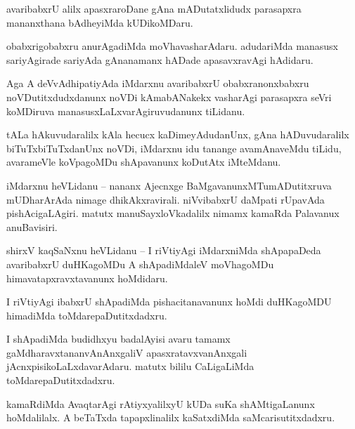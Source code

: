 \documentclass{article}
\begin{document}
\begin{mn}%
avaribabxrU alilx apasxraroDane gAna mADutatxlidudx parasapxra mananxthana bAdheyiMda kUDikoMDaru.
\end{mn}

\begin{mn}%
obabxrigobabxru anurAgadiMda moVhavasharAdaru. adudariMda manasusx sariyAgirade sariyAda gAnanamanx 
hADade apasavxravAgi hAdidaru.
\end{mn}

\begin{mn}%
Aga A deVvAdhipatiyAda iMdarxnu avaribabxrU obabxranonxbabxru noVDutitxdudxdanunx noVDi 
kAmabANakekx vasharAgi parasapxra seVri koMDiruva manasusxLaLxvarAgiruvudanunx tiLidanu.
\end{mn}

\begin{mn}%
tALa hAkuvudaralilx kAla hecucx kaDimeyAdudanUnx, gAna hADuvudaralilx biTuTxbiTuTxdanUnx noVDi, 
iMdarxnu idu tanange avamAnaveMdu tiLidu, avarameVle koVpagoMDu shApavanunx koDutAtx iMteMdanu.
\end{mn}

\begin{mn}%
iMdarxnu heVLidanu -- nananx Ajecnxge BaMgavanunxMTumADutitxruva mUDharArAda nimage 
dhikAkxravirali. niVvibabxrU daMpati rUpavAda pishAcigaLAgiri. matutx manuSayxloVkadalilx nimamx 
kamaRda Palavanux anuBavisiri.
\end{mn}

\begin{mn}%
shirxV kaqSaNxnu heVLidanu -- I riVtiyAgi iMdarxniMda shApapaDeda avaribabxrU duHKagoMDu A 
shApadiMdaleV moVhagoMDu himavatapxravxtavanunx hoMdidaru.
\end{mn}

\begin{mn}%
I riVtiyAgi ibabxrU shApadiMda pishacitanavanunx hoMdi duHKagoMDU himadiMda toMdarepaDutitxdadxru.
\end{mn}

\begin{mn}%
I shApadiMda budidhxyu badalAyisi avaru tamamx gaMdharavxtananvAnAnxgaliV apasxratavxvanAnxgali 
jAcnxpisikoLaLxdavarAdaru. matutx bililu CaLigaLiMda toMdarepaDutitxdadxru.
\end{mn}

\begin{mn}%
kamaRdiMda AvaqtarAgi rAtiyxyalilxyU kUDa suKa shAMtigaLanunx hoMdalilalx. A beTaTxda 
tapapxlinalilx kaSatxdiMda saMcarisutitxdadxru.
\end{mn}
\end{document}
